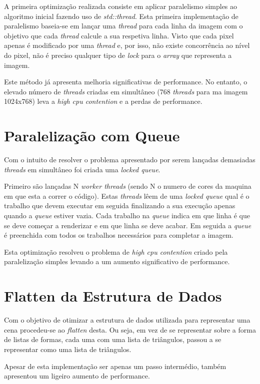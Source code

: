 \documentclass[a4paper]{report}
\begin{document}
A primeira optimização realizada consiste em aplicar paralelismo simples ao
algoritmo inicial fazendo uso de \textit{std::thread}. Esta primeira
implementação de paralelismo baseia-se em lançar uma \textit{thread} para cada
linha da imagem com o objetivo que cada \textit{thread} calcule a sua respetiva
linha. Visto que cada pixel apenas é modificado por uma \textit{thread} e, por
isso, não existe concorrência ao nível do pixel, não é preciso qualquer tipo de
\textit{lock} para o \textit{array} que representa a imagem.

Este método já apresenta melhoria significativas de performance. No entanto, o
elevado número de \textit{threads} criadas em simultâneo (768 \textit{threads}
para ma imagem 1024x768) leva a \textit{high cpu contention} e a perdas de
performance.

\section{Paralelização com Queue}

Com o intuito de resolver o problema apresentado por serem lançadas demasiadas
\textit{threads} em simultâneo foi criada uma \textit{locked queue}.

Primeiro são lançadas N \textit{worker threads} (sendo N o numero de cores da
maquina em que esta a correr o código). Estas \textit{threads} lêem de uma
\textit{locked queue} qual é o trabalho que devem executar em seguida
finalizando a sua execução apenas quando a \textit{queue} estiver vazia. Cada
trabalho na \textit{queue} indica em que linha é que se deve começar a
renderizar e em que linha se deve acabar. Em seguida a \textit{queue} é
preenchida com todos os trabalhos necessários para
completar a imagem.

Esta optimização resolveu o problema de \textit{high cpu contention} criado pela
paralelização simples levando a um aumento significativo de performance.

\section{Flatten da Estrutura de Dados}

Com o objetivo de otimizar a estrutura de dados utilizada para representar uma
cena procedeu-se ao \textit{flatten} desta. Ou seja, em vez de se representar
sobre a forma de listas de formas, cada uma com uma lista de triângulos, passou
a se representar como uma lista de triângulos.

Apesar de esta implementação ser apenas um passo intermédio, também apresentou
um ligeiro aumento de performance.
\end{document}
